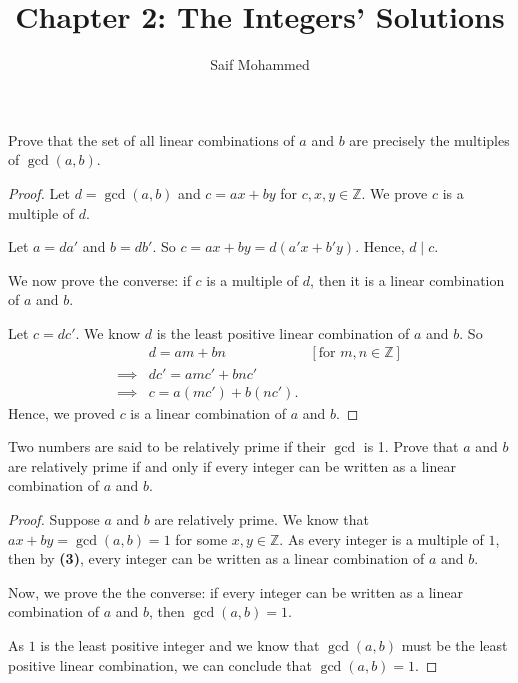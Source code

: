 \documentclass[12pt]{article}
\newenvironment{exercise}[2][Exercise]{\begin{trivlist}
\item[\hskip \labelsep {\bfseries #1}\hskip \labelsep {\bfseries #2.}]}{\end{trivlist}}
\begin{document}
 
%
%
 
\title{Chapter 2: The Integers' Solutions} %
\author{Saif Mohammed} %
\maketitle
\begin{exercise}{3}
Prove that the set of all linear combinations of \(a\) and \(b\) are precisely the multiples of \(\gcd(a, b)\).
\end{exercise}

\begin{proof}
Let $d=\gcd(a,b)$ and $c=ax+by$ for $c,x,y\in \mathbb{Z}$. We prove $c$ is a multiple of $d$.

Let $a=da'$ and $b=db'$. So $c=ax+by=d(a'x+b'y)$. Hence, $d \mid c$.

We now prove the converse: if $c$ is a multiple of $d$, then it is a linear combination of $a$ and $b$.

Let $c=dc'$. We know $d$ is the least positive linear combination of $a$ and $b$. So
\begin{align*}
    & d = am+bn & \left[\text{for }m, n\in \mathbb{Z} \right]\\
    \implies & dc' = amc'+bnc' \\
    \implies & c = a(mc')+b(nc').
\end{align*}
Hence, we proved $c$ is a linear combination of $a$ and $b$.
\end{proof}

\begin{exercise}{4}
Two numbers are said to be relatively prime if their \(\gcd\) is 1. Prove that \(a\) and \(b\) are relatively prime if and only if every integer can be written as a linear combination of \(a\) and \(b\).
\end{exercise}

\begin{proof}
Suppose $a$ and $b$ are relatively prime. We know that $ax+by=\gcd(a,b)=1$ for some $x, y\in \mathbb{Z}$. As every integer is a multiple of $1$, then by \textbf{(3)}, every integer can be written as a linear combination of $a$ and $b$.

Now, we prove the the converse: if every integer can be written as a linear combination of $a$ and $b$, then $\gcd(a,b)=1$.

As $1$ is the least positive integer and we know that $\gcd(a,b)$ must be the least positive linear combination, we can conclude that $\gcd(a,b)=1$.
\end{proof}
\end{document}
